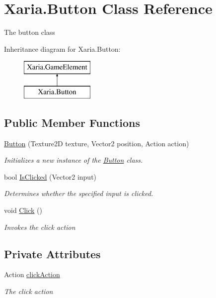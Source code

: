 \hypertarget{classXaria_1_1Button}{}\section{Xaria.\+Button Class Reference}
\label{classXaria_1_1Button}


The button class  


Inheritance diagram for Xaria.\+Button\+:\begin{figure}[H]
\begin{center}
\leavevmode
\includegraphics[height=2.000000cm]{classXaria_1_1Button}
\end{center}
\end{figure}
\subsection*{Public Member Functions}
\begin{DoxyCompactItemize}
\item 
\hyperlink{classXaria_1_1Button_adb44a71990a4da16b32e721b30a0d219}{Button} (Texture2D texture, Vector2 position, Action action)
\begin{DoxyCompactList}\small\item\em Initializes a new instance of the \hyperlink{classXaria_1_1Button}{Button} class. \end{DoxyCompactList}\item 
bool \hyperlink{classXaria_1_1Button_a28b79628de3274d34fd14f159d84a4d3}{Is\+Clicked} (Vector2 input)
\begin{DoxyCompactList}\small\item\em Determines whether the specified input is clicked. \end{DoxyCompactList}\item 
void \hyperlink{classXaria_1_1Button_a774571620215fb6a3b1ae9315023bd41}{Click} ()
\begin{DoxyCompactList}\small\item\em Invokes the click action \end{DoxyCompactList}\end{DoxyCompactItemize}
\subsection*{Private Attributes}
\begin{DoxyCompactItemize}
\item 
Action \hyperlink{classXaria_1_1Button_adbeeb3818c76acb80a43342fc24f1f0f}{click\+Action}
\begin{DoxyCompactList}\small\item\em The click action \end{DoxyCompactList}\end{DoxyCompactItemize}
